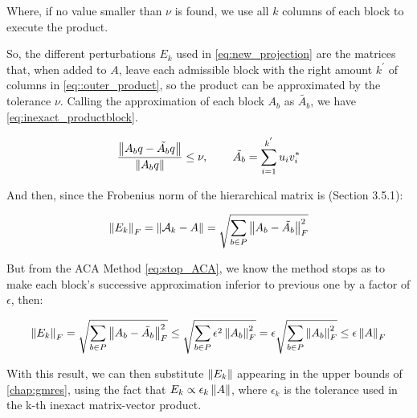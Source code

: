Where, if no value smaller than $\nu$ is found, we use all $k$ columns of each block to execute the product.

So, the different perturbations $E_{k}$ used in \ref{eq:new_projection} are the matrices that, when added to $A$, leave each admissible block with the right amount $k^{'}$ of columns in \ref{eq::outer_product}, so the product can be approximated by the tolerance $\nu$. Calling the approximation of each block $A_{b}$ as $\tilde{A_{b}}$, we have \ref{eq:inexact_productblock}.

\begin{equation}\label{eq:inexact_productblock}
    \frac{\left\lVert A_{b}q - \tilde{A_{b}}q \right\rVert}{\left\lVert A_{b}q\right\rVert} \leq \nu, \hspace{0.3in} \tilde{A_{b}} = \sum_{i=1} ^{k^{'}} u_{i} v_{i} ^{*}
\end{equation}


And then, since the Frobenius norm of the hierarchical matrix is \cite{hackbusch2015hierarchical}(Section 3.5.1):

\begin{equation}
    \left\lVert E_{k}\right\rVert_{F}= \left\lVert\mathcal{A}_{k} - A\right\rVert = \sqrt{\sum_{b \in P} \left\lVert A_{b} - \tilde{A_{b}}\right\rVert_{F}^{2} }
\end{equation}

But from the ACA Method \ref{eq:stop_ACA}, we know the method stops as to make each block's successive approximation inferior to previous one by a factor of $\epsilon$, then:

\begin{equation}
    \left\lVert E_{k}\right\rVert_{F} = \sqrt{\sum_{b \in P} \left\lVert A_{b} - \tilde{A_{b}}\right\rVert_{F}^{2} } \leq \sqrt{\sum_{b\in P}\epsilon^{2}\left\lVert A_{b}\right\rVert_{F}^{2}} = \epsilon \sqrt{\sum_{b \in P}\left\lVert A_{b}\right\rVert_{F}^{2}}
    \leq \epsilon \left\lVert A\right\rVert_{F}
\end{equation}



With this result, we can then substitute $\left\lVert E_{k}\right\rVert$ appearing in the upper bounds of \autoref{chap:gmres}, using the fact that $E_{k}\propto \epsilon_{k} \left\lVert A\right\rVert$, where $\epsilon_{k}$ is the tolerance used in the k-th inexact matrix-vector product.



